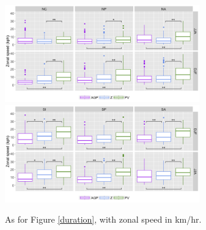 \documentclass[smallextended]{svjour3}       %
\numberwithin{equation}{section}
\begin{document}

\begin{figure}
    \centering
    \includegraphics[width=0.75\textwidth]{fig_speed_NH.png}
        \includegraphics[width=0.75\textwidth]{fig_speed_SH.png}
    \caption{As for Figure \ref{duration}, with zonal speed in km/hr.}
    \label{shspeed}
\end{figure}
\end{document}

